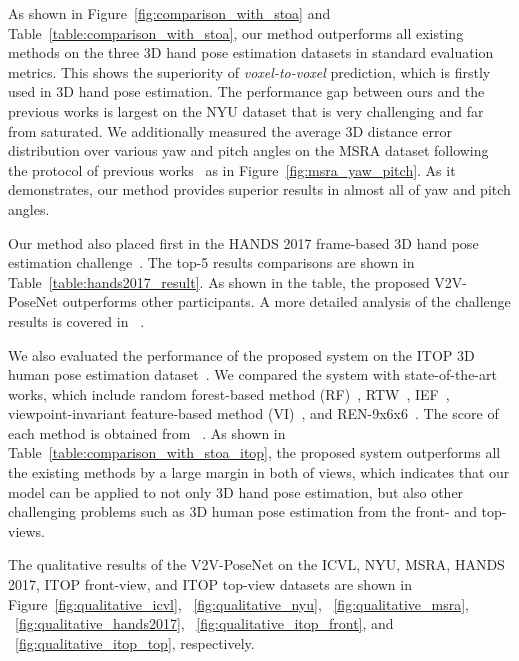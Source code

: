 \documentclass[10pt,twocolumn,letterpaper]{article}
\begin{document}
As shown in Figure~\ref{fig:comparison_with_stoa} and Table~\ref{table:comparison_with_stoa}, our method outperforms all existing methods on the three 3D hand pose estimation datasets in standard evaluation metrics. This shows the superiority of \emph{voxel-to-voxel} prediction, which is firstly used in 3D hand pose estimation. The performance gap between ours and the previous works is largest on the NYU dataset that is very challenging and far from saturated. We additionally measured the average 3D distance error distribution over various yaw and pitch angles on the MSRA dataset following the protocol of previous works~\cite{sun2015cascaded} as in Figure~\ref{fig:msra_yaw_pitch}. As it demonstrates, our method provides superior results in almost all of yaw and pitch angles.

Our method also placed first in the HANDS 2017 frame-based 3D hand pose estimation challenge~\cite{yuan20172017}. The top-5 results comparisons are shown in Table~\ref{table:hands2017_result}. As shown in the table, the proposed V2V-PoseNet outperforms other participants. A more detailed analysis of the challenge results is covered in ~\cite{yuan20183d}.

We also evaluated the performance of the proposed system on the ITOP 3D human pose estimation dataset~\cite{haque2016towards}. We compared the system with state-of-the-art works, which include random forest-based method (RF)~\cite{shotton2013real}, RTW~\cite{yub2015random}, IEF~\cite{carreira2016human}, viewpoint-invariant feature-based method (VI)~\cite{haque2016towards}, and  REN-9x6x6~\cite{guo2017towards}. The score of each method is obtained from ~\cite{haque2016towards,guo2017towards}. As shown in Table~\ref{table:comparison_with_stoa_itop}, the proposed system outperforms all the existing methods by a large margin in both of views, which indicates that our model can be applied to not only 3D hand pose estimation, but also other challenging problems such as 3D human pose estimation from the front- and top-views. 

The qualitative results of the V2V-PoseNet on the ICVL, NYU, MSRA, HANDS 2017, ITOP front-view, and ITOP top-view datasets are shown in Figure~\ref{fig:qualitative_icvl}, ~\ref{fig:qualitative_nyu}, ~\ref{fig:qualitative_msra}, ~\ref{fig:qualitative_hands2017}, ~\ref{fig:qualitative_itop_front}, and ~\ref{fig:qualitative_itop_top}, respectively.
\end{document}
